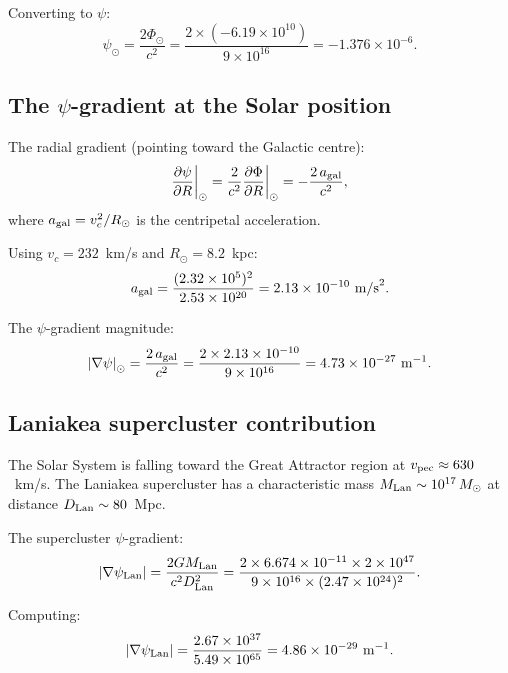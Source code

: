 \documentclass[aps,prl,twocolumn,superscriptaddress,showpacs]{revtex4-2}
\newcommand{\Msun}{M_\odot}
\begin{document}
Converting to $\psi$:
\begin{equation}
\psi_\odot = \frac{2\Phi_\odot}{c^2}
= \frac{2\times(-6.19\times 10^{10})}{9\times 10^{16}}
= -1.376\times 10^{-6}.
\label{eq:psi_solar}
\end{equation}

\subsection{The $\psi$-gradient at the Solar position}

The radial gradient (pointing toward the Galactic centre):
\begin{equation}
\frac{\partial\psi}{\partial R}\bigg|_\odot
= \frac{2}{c^2}\frac{\partial\Phi}{\partial R}\bigg|_\odot
= -\frac{2\,a_{\rm gal}}{c^2},
\end{equation}
where $a_{\rm gal} = v_c^2/R_\odot$ is the centripetal acceleration.

Using $v_c = 232$~km/s and $R_\odot = 8.2$~kpc:
\begin{equation}
a_{\rm gal} = \frac{(2.32\times 10^5)^2}{2.53\times 10^{20}}
= 2.13\times 10^{-10}~\text{m/s}^2.
\end{equation}

The $\psi$-gradient magnitude:
\begin{equation}
\left|\nabla\psi\right|_\odot = \frac{2\,a_{\rm gal}}{c^2}
= \frac{2\times 2.13\times 10^{-10}}{9\times 10^{16}}
= 4.73\times 10^{-27}~\text{m}^{-1}.
\label{eq:grad_psi_MW}
\end{equation}

\subsection{Laniakea supercluster contribution}

The Solar System is falling toward the Great Attractor region
at $v_{\rm pec} \approx 630$~km/s.  The Laniakea supercluster
has a characteristic mass $M_{\rm Lan} \sim 10^{17}\,\Msun$
at distance $D_{\rm Lan} \sim 80$~Mpc.

The supercluster $\psi$-gradient:
\begin{equation}
|\nabla\psi_{\rm Lan}| = \frac{2GM_{\rm Lan}}{c^2 D_{\rm Lan}^2}
= \frac{2\times 6.674\times 10^{-11}\times 2\times 10^{47}}
{9\times 10^{16}\times(2.47\times 10^{24})^2}.
\end{equation}

Computing:
\begin{equation}
|\nabla\psi_{\rm Lan}| = \frac{2.67\times 10^{37}}{5.49\times 10^{65}}
= 4.86\times 10^{-29}~\text{m}^{-1}.
\end{equation}
\end{document}
